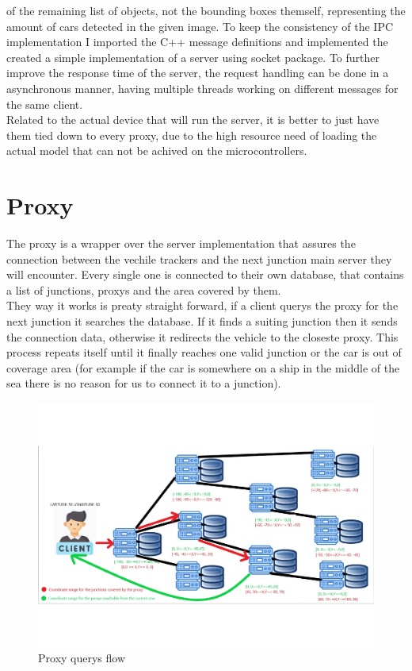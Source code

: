 \documentclass[17pt]{report}
\begin{document}
of the remaining list of objects, not the bounding boxes themself, representing 
the amount of cars detected in the given image. To keep the consistency of the IPC
implementation I imported the C++ message definitions and implemented the created
a simple implementation of a server using socket package. To further improve
the response time of the server, the request handling can be done in a asynchronous
manner, having multiple threads working on different messages for the same client. \\
\indent
Related to the actual device that will run the server, it is better to just have 
them tied down to every proxy, due to the high resource need of loading the actual 
model that can not be achived on the microcontrollers.


\pagebreak

\section{Proxy}
\indent \indent
The proxy is a wrapper over the server implementation that assures the connection
between the vechile trackers and the next junction main server they will encounter.
Every single one is connected to their own database, that contains a list of junctions,
proxys and the area covered by them. \\
\indent \indent
They way it works is preaty straight forward, if a client 
querys the proxy for the next junction it searches the database. If it finds 
a suiting junction then it sends the connection data, otherwise it redirects 
the vehicle to the closeste proxy. This process repeats itself until it 
finally reaches one valid junction or the car is out of coverage area (for 
example if the car is somewhere on a ship in the middle of the sea there is 
no reason for us to connect it to a junction).

\begin{figure}[h!]
    \includegraphics[width=\textwidth]{Sketches/ProxyFlowV2.png}
    \caption{Proxy querys flow}
    \label{fig:Proxy querys flow}
\end{figure}
\end{document}
